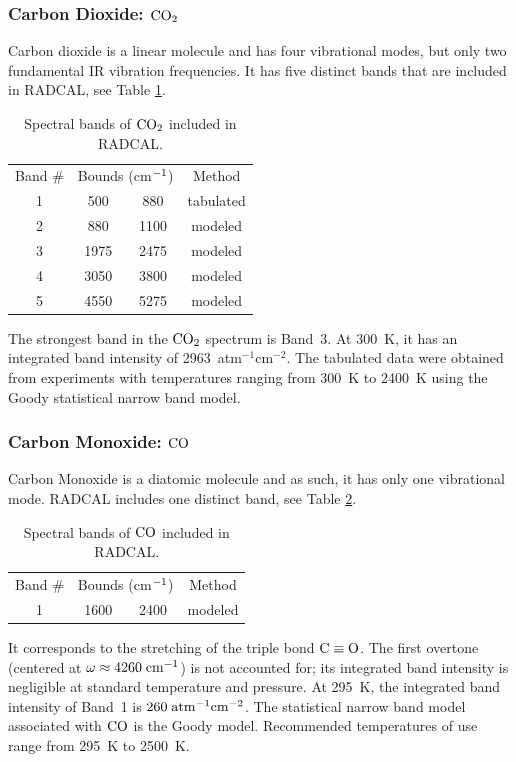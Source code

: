 \subsubsection{Carbon Dioxide: $\rm CO_2$}

Carbon dioxide is a linear molecule and has four vibrational modes, but only two fundamental IR vibration frequencies. It has five distinct bands that are included in RADCAL, see Table \ref{Table::CO2}.
\begin{table}[h!]
    \centering
    \caption{Spectral bands of $\rm CO_2$ included in RADCAL.}
    \vspace{0.1in}
    \label{Table::CO2}
    \begin{tabular}{|c|c|c|c|}
      \hline
      Band \# & \multicolumn{2}{|l|}{Bounds (cm$\rm ^{-1}$) } & Method \\
      \cline{1-4}
      1 &  500 & 880  & tabulated \\
      2 &  880 & 1100 & modeled \\
      3 & 1975 & 2475 & modeled \\
      4 & 3050 & 3800 & modeled \\
      5 & 4550 & 5275 & modeled \\
      \hline
    \end{tabular}
\end{table}
The strongest band in the $\rm CO_2$ spectrum is Band~3. At 300~K, it has an integrated band intensity of 2963~atm$^{-1}$cm$^{-2}$. The tabulated data were obtained from experiments with temperatures ranging from 300~K to 2400~K using the Goody statistical narrow band model.

\subsubsection{Carbon Monoxide: $\rm CO$}

Carbon Monoxide is a diatomic molecule and as such, it has only one vibrational mode. RADCAL includes one distinct band, see Table \ref{Table::CO}.
\begin{table}[h!]
    \centering
    \caption{Spectral bands of $\rm CO$ included in RADCAL.}
    \vspace{0.1in}
    \label{Table::CO}
    \begin{tabular}{|c|c|c|c|}
      \hline
      Band \# & \multicolumn{2}{|l|}{Bounds (cm$\rm ^{-1}$) } & Method \\
      \cline{1-4}
      1 & 1600 & 2400 & modeled \\
      \hline
    \end{tabular}
\end{table}
It corresponds to the stretching of the triple bond $\rm C \equiv O$. The first overtone (centered at $ \omega\approx 4260\;\rm {cm^{-1}}$) is not accounted for; its integrated band intensity is negligible at standard temperature and pressure. At 295~K, the integrated band intensity of Band~1 is $260\;\rm {atm^{-1}cm^{-2}}$.
The statistical narrow band model associated with $\rm CO$ is the Goody model. Recommended temperatures of use range from 295~K to 2500~K.

